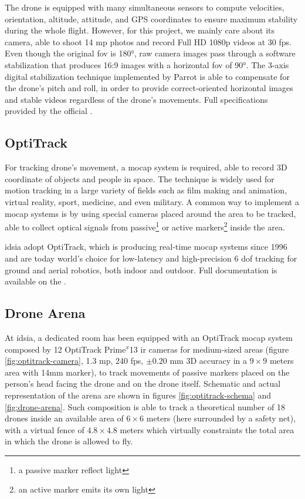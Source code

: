 The drone is equipped with many simultaneous sensors to compute velocities, orientation, altitude, attitude, and GPS coordinates to ensure maximum stability during the whole flight. However, for this project, we mainly care about its camera, able to shoot 14 \gls{mp} photos and record Full HD 1080p videos at 30 \gls{fps}. Even though the original \gls{fov} is 180°, raw camera images pass through a software stabilization that produces 16:9 images with a horizontal \gls{fov} of 90°. The 3-axis digital stabilization technique implemented by Parrot is able to compensate for the drone's pitch and roll, in order to provide correct-oriented horizontal images and stable videos regardless of the drone's movements. Full specifications provided by the official \cite{bebop}.

  

\subsection{OptiTrack}
\label{subsec:optitrack}

For tracking drone's movement, a \gls{mocap} system is required, able to record 3D coordinate of objects and people in space. The technique is widely used for motion tracking in a large variety of fields such as film making and animation, virtual reality, sport, medicine, and even military. A common way to implement a \gls{mocap} systems is by using special cameras placed around the area to be tracked, able to collect optical signals from passive\footnote{a passive marker reflect light} or active markers\footnote{an active marker emits its own light} inside the area.

\medskip

\gls{idsia} adopt OptiTrack, which is producing real-time \gls{mocap} systems since 1996 and are today world’s choice for low-latency and high-precision 6 \gls{dof} tracking for ground and aerial robotics, both indoor and outdoor. Full documentation is available on the \cite{optitrack}.



\subsection{Drone Arena}
\label{subsec:drone-arena}

At \gls{idsia}, a dedicated room has been equipped with an OptiTrack \gls{mocap} system composed by 12 OptiTrack Prime$^x$13 \gls{ir} cameras for medium-sized areas (figure \ref{fig:optitrack-camera}, 1.3 \gls{mp}, 240 \gls{fps}, $\pm0.20$ mm 3D accuracy in a $9 \times 9$ meters area with 14mm marker), to track movements of passive markers placed on the person's head facing the drone and on the drone itself. Schematic and actual representation of the arena are shown in figures \ref{fig:optitrack-schema} and \ref{fig:drone-arena}. Such composition is able to track a theoretical number of 18 drones inside an available area of $6 \times 6$ meters (here surrounded by a safety net), with a virtual fence of $4.8 \times 4.8$ meters which virtually constraints the total area in which the drone is allowed to fly.

